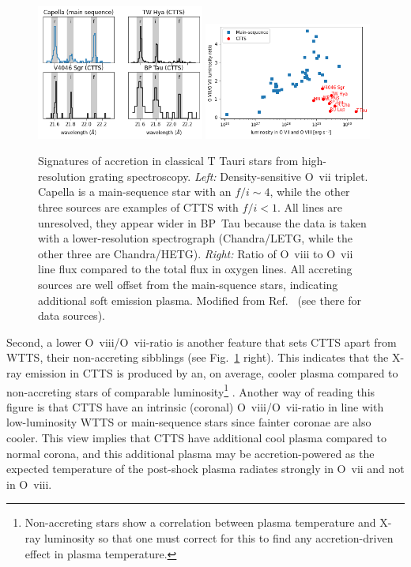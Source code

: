 \documentclass[graybox, nosecnum]{svmult}
\begin{document}
\begin{figure}[t]
\centering
\includegraphics[width=0.49\textwidth]{figs/o7f2i.png}
\includegraphics[width=0.49\textwidth]{figs/o72o8.png}
\caption{Signatures of accretion in classical T Tauri stars from high-resolution grating spectroscopy. \emph{Left:} Density-sensitive O~{\sc vii} triplet. Capella is a main-sequence star with an $f/i\sim 4$, while the other three sources are examples of CTTS with $f/i < 1$. All lines are unresolved, they appear wider in BP~Tau because the data is taken with a lower-resolution spectrograph (Chandra/LETG, while the other three are Chandra/HETG). \emph{Right:} Ratio of O~{\sc viii} to O~{\sc vii} line flux compared to the total flux in oxygen lines. All accreting sources are well offset from the main-squence stars, indicating additional soft emission plasma. Modified from Ref.~ \cite{2013ApJ...771...70G} (see there for data sources). \label{fig:softexcess}}
\end{figure}


Second, a lower O~{\sc viii}/O~{\sc vii}-ratio is another feature that sets CTTS  apart from WTTS, their non-accreting sibblings (see Fig.~\ref{fig:softexcess} right). This indicates that the X-ray emission in CTTS is produced by an, on average, cooler plasma compared to non-accreting stars of comparable luminosity\footnote{Non-accreting stars show a correlation between plasma temperature and X-ray luminosity so that one must correct for this to find any accretion-driven effect in plasma temperature.} \cite{2007A&A...473..229R,2007A&A...474L..25G}. Another way of reading this figure is that 
CTTS have an intrinsic (coronal) O~{\sc viii}/O~{\sc vii}-ratio in line with low-luminosity WTTS or main-sequence stars since fainter coronae are also cooler. This view implies that CTTS have additional cool plasma compared to normal corona, and this additional plasma may be accretion-powered as the expected temperature of the post-shock plasma radiates strongly in O~{\sc vii} and not in O~{\sc viii}.
\end{document}
